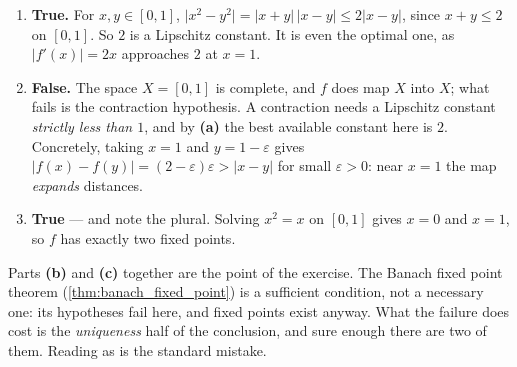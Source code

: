\begin{exercisesolution}
\label{sol:banach_hypotheses_true_false}
\begin{enumerate}[label=\textbf{(\alph*)}]
  \item \textbf{True.} For $x,y \in [0,1]$,
    $\lvert x^2 - y^2\rvert = \lvert x+y\rvert\,\lvert x-y\rvert \le 2\lvert x-y\rvert$,
    since $x + y \le 2$ on $[0,1]$. So $2$ is a Lipschitz constant. It is even the optimal one, as
    $\lvert f'(x)\rvert = 2x$ approaches $2$ at $x = 1$.
  \item \textbf{False.} The space $X = [0,1]$ is complete, and $f$ does map $X$ into $X$; what fails
    is the contraction hypothesis. A contraction needs a Lipschitz constant \emph{strictly less
    than $1$}, and by \textbf{(a)} the best available constant here is $2$. Concretely, taking
    $x = 1$ and $y = 1 - \varepsilon$ gives
    $\lvert f(x) - f(y)\rvert = (2-\varepsilon)\varepsilon > \lvert x - y\rvert$ for small
    $\varepsilon > 0$: near $x = 1$ the map \emph{expands} distances.
  \item \textbf{True} --- and note the plural. Solving $x^2 = x$ on $[0,1]$ gives $x = 0$ and
    $x = 1$, so $f$ has exactly two fixed points.
\end{enumerate}
\begin{remark}
Parts \textbf{(b)} and \textbf{(c)} together are the point of the exercise. The Banach fixed point
theorem (\cref{thm:banach_fixed_point}) is a sufficient condition, not a necessary one: its
hypotheses fail here, and fixed points exist anyway. What the failure does cost is the
\emph{uniqueness} half of the conclusion, and sure enough there are two of them. Reading  as  is the standard mistake.
\end{remark}
\end{exercisesolution}

